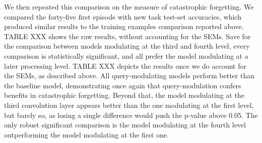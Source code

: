 We then repeated this comparison on the measure of catastrophic forgetting. We compared the forty-five first episode with new task test-set accuracies, which produced similar results to the training examples comparison reported above. TABLE XXX shows the raw results, without accounting for the SEMs. Save for the comparison between models modulating at the third and fourth level, every comparison is statistically significant, and all prefer the model modulating at a later processing level. TABLE XXX depicts the results once we do account for the SEMs, as described above. All query-modulating models perform better than the baseline model, demonstrating once again that query-modulation confers benefits in catastrophic forgetting. Beyond that, the model modulating at the third convolution layer appears better than the one modulating at the first level, but barely so, as losing a single difference would push the p-value above 0.05. The only robust significant comparison is the model modulating at the fourth level outperforming the model modulating at the first one.

